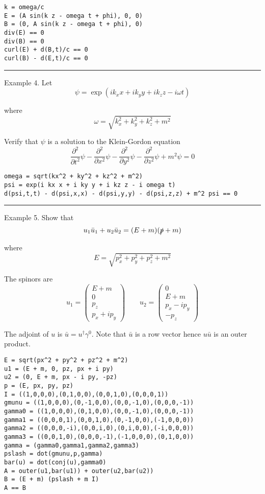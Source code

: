 \documentclass[12pt]{article}
\begin{document}
\begin{verbatim}
k = omega/c
E = (A sin(k z - omega t + phi), 0, 0)
B = (0, A sin(k z - omega t + phi), 0)
div(E) == 0
div(B) == 0
curl(E) + d(B,t)/c == 0
curl(B) - d(E,t)/c == 0
\end{verbatim}

\bigskip
\hrule

\bigskip
\noindent
Example 4. Let
$$
\psi=\exp(ik_xx+ik_yy+ik_zz-i\omega t)
$$

\noindent
where
$$
\omega=\sqrt{k_x^2+k_y^2+k_z^2+m^2}
$$

\noindent
Verify that $\psi$ is a solution to the Klein-Gordon equation
$$
\frac{\partial^2}{\partial t^2}\psi
-\frac{\partial^2}{\partial x^2}\psi
-\frac{\partial^2}{\partial y^2}\psi
-\frac{\partial^2}{\partial z^2}\psi
+m^2\psi=0
$$

\begin{verbatim}
omega = sqrt(kx^2 + ky^2 + kz^2 + m^2)
psi = exp(i kx x + i ky y + i kz z - i omega t)
d(psi,t,t) - d(psi,x,x) - d(psi,y,y) - d(psi,z,z) + m^2 psi == 0
\end{verbatim}

\bigskip
\hrule

\bigskip
\noindent
Example 5. Show that
$$
u_1\bar{u}_1+u_2\bar{u}_2=(E+m)(\slashed{p}+m)
$$

\noindent
where
$$
E=\sqrt{p_x^2+p_y^2+p_z^2+m^2}
$$

\noindent
The spinors are
$$
u_1=\begin{pmatrix}E+m\\0\\p_z\\p_x+ip_y\end{pmatrix}
\qquad
u_2=\begin{pmatrix}0\\E+m\\p_x-ip_y\\-p_z\end{pmatrix}
$$

\noindent
The adjoint of $u$ is $\bar{u}=u^\dag\gamma^0$.
Note that $\bar{u}$ is a row vector hence $u\bar{u}$ is an outer product.

\begin{verbatim}
E = sqrt(px^2 + py^2 + pz^2 + m^2)
u1 = (E + m, 0, pz, px + i py)
u2 = (0, E + m, px - i py, -pz)
p = (E, px, py, pz)
I = ((1,0,0,0),(0,1,0,0),(0,0,1,0),(0,0,0,1))
gmunu = ((1,0,0,0),(0,-1,0,0),(0,0,-1,0),(0,0,0,-1))
gamma0 = ((1,0,0,0),(0,1,0,0),(0,0,-1,0),(0,0,0,-1))
gamma1 = ((0,0,0,1),(0,0,1,0),(0,-1,0,0),(-1,0,0,0))
gamma2 = ((0,0,0,-i),(0,0,i,0),(0,i,0,0),(-i,0,0,0))
gamma3 = ((0,0,1,0),(0,0,0,-1),(-1,0,0,0),(0,1,0,0))
gamma = (gamma0,gamma1,gamma2,gamma3)
pslash = dot(gmunu,p,gamma)
bar(u) = dot(conj(u),gamma0)
A = outer(u1,bar(u1)) + outer(u2,bar(u2))
B = (E + m) (pslash + m I)
A == B
\end{verbatim}
\end{document}
